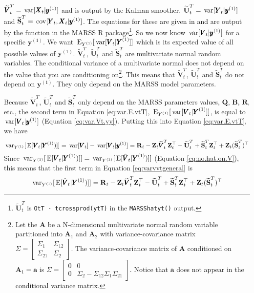 \documentclass[]{article}
\def\UPS{\mbox{\boldmath $\Upsilon$}}
\def\XI{\mbox{\boldmath $\Xi$}}
\def\AA{\mbox{$\mathbf A$}}	\def\aa{\mbox{$\mathbf a$}}
\def\BB{\mbox{$\mathbf B$}}	\def\bb{\mbox{$\mathbf b$}} \def\Bb{\mbox{$\mathbf J$}} \def\Ba{\mbox{$\mathbf L$}} \def\Bm{\UPS}
\def\E{\,\textup{\textrm{E}}}
\def\QQ{\mbox{$\mathbf Q$}}	 \def\qq{\mbox{$\mathbf q$}} \def\Qb{\mbox{$\mathbf G$}}  \def\Qm{\mathbb{Q}}
\def\RR{\mbox{$\mathbf R$}}	 \def\rr{\mbox{$\mathbf r$}} \def\Rb{\mbox{$\mathbf H$}}	\def\Rm{\mathbb{R}}
\def\Ss{\mbox{$\mathbf S$}}
\def\UU{\mbox{$\mathbf U$}}	\def\uu{\mbox{$\mathbf u$}}
\def\VV{\mbox{$\pmb{V}$}}	\def\vv{\mbox{$\pmb{v}$}}
\def\XX{\mbox{$\pmb{X}$}}	\def\xx{\mbox{$\pmb{x}$}}
\def\YY{\mbox{$\pmb{Y}$}}	\def\yy{\mbox{$\pmb{y}$}}
\def\ZZ{\mbox{$\mathbf Z$}}	\def\zz{\mbox{$\mathbf z$}}	\def\Zb{\mbox{$\mathbf M$}} \def\Za{\mbox{$\mathbf N$}} \def\Zm{\XI}
\def\var{\,\textup{\textrm{var}}}
\def\cov{\,\textup{\textrm{cov}}}
\def\hatVt{\widetilde{\VV}_t^T}
\def\hatUt{\widetilde{\UU}_t^T}
\def\hatSt{\widetilde{\Ss}_t^T}
\begin{document}
$\hatVt = \var[ \XX_t | \yy^{(1)} ]$ and is output by the Kalman smoother. $\hatUt=\var[\YY_t|\yy^{(1)}]$ and $\hatSt=\cov[\YY_t,\XX_t|\yy^{(1)}]$. The equations for these are given in \citet{Holmes2010} and are output by the \verb@MARSShatyt@ function in the MARSS R package\footnote{$\hatUt$ is  \texttt{OtT - tcrossprod(ytT)} in the \texttt{MARSShatyt()} output.}.
So we now know $\var[\VV_t|\yy^{(1)}]$ for a specific $\yy^{(1)}$. We want $\E_{Y^{(1)}}[\var[\VV_t|\YY^{(1)}]]$ which is its expected value of all possible values of $\yy^{(1)}$. $\hatVt$, $\hatUt$ and $\hatSt$ are multivariate normal random variables. The conditional variance of a multivariate normal does not depend on the value that you are conditioning on\footnote{Let the $\AA$ be a N-dimensional multivariate normal random variable partitioned into $\AA_1$ and $\AA_2$ with variance-covariance matrix $\Sigma = \begin{bmatrix}
\Sigma_1 & \Sigma_{12} \\
\Sigma_21 & \Sigma_{2}
\end{bmatrix}$.  The variance-covariance matrix of $\AA$ conditioned on $\AA_1=\aa$ is $\Sigma = \begin{bmatrix}
0 & 0 \\
0 & \Sigma_2 - \Sigma_{12}\Sigma_{1}\Sigma_{21}
\end{bmatrix}$. Notice that $\aa$ does not appear in the conditional variance matrix.}. This means that $\hatVt$, $\hatUt$ and $\hatSt$ do not depend on $\yy^{(1)}$. They only depend on the MARSS model parameters.

Because $\hatVt$, $\hatUt$ and $\hatSt$ only depend on the MARSS parameters values, $\QQ$, $\BB$, $\RR$, etc., the second term in Equation \ref{eq:var.E.vtT}, $\E_{Y^{(1)}}[\var[\VV_t|\YY^{(1)}]]$, is equal to $\var[\VV_t|\yy^{(1)}]$ (Equation \ref{eq:var.Vt.yy}). Putting this into Equation \ref{eq:var.E.vtT}, we have
\begin{equation}\label{eqn:conditionalvtfinala}
\var_{Y^{(1)}}[\E[\VV_t|\YY^{(1)})]]  = \var[\VV_t] - \var[\VV_t|\yy^{(1)}] = \RR_t - \ZZ_t \hatVt \ZZ_t^\top - \hatUt + \hatSt\ZZ_t^\top + \ZZ_t(\hatSt)^\top
\end{equation}
Since $\var_{Y^{(1)}}[\E[\VV_t|\YY^{(1)})]] = \var_{Y^{(1)}}[\E[\hat{\VV}_t|\YY^{(1)})]]$ (Equation \ref{eq:no.hat.on.V}), this means that the first term in Equation \ref{eq:varvvtgeneral} is
\begin{equation}\label{eqn:conditionalvtfinal}
\var_{Y^{(1)}}[\E[\hat{\VV}_t|\YY^{(1)})]]  =  \RR_t - \ZZ_t \hatVt \ZZ_t^\top - \hatUt + \hatSt\ZZ_t^\top + \ZZ_t(\hatSt)^\top
\end{equation}
\end{document}
